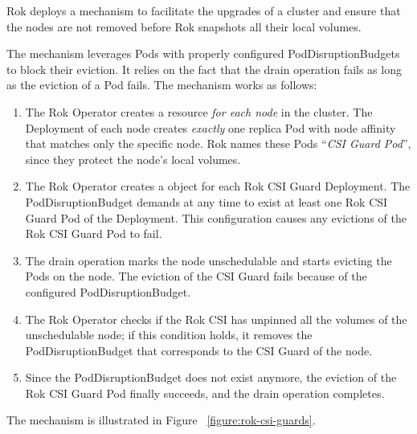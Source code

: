 Rok deploys a mechanism to facilitate the upgrades of a cluster and ensure that
the nodes are not removed before Rok snapshots all their local volumes.

The mechanism leverages Pods with properly configured PodDisruptionBudgets to
block their eviction. It relies on the fact that the drain operation fails as
long as the eviction of a Pod fails. The mechanism works as follows:

\begin{enumerate}
	\tightlist
	\item The Rok Operator creates a  resource \textit{for each
		      node} in the cluster. The Deployment of each node creates
	      \textit{exactly} one replica Pod with node affinity that matches
	      only the specific node. Rok names these Pods  ``\textit{CSI Guard
		      Pod}'', since they protect the node's local volumes.
	\item The Rok Operator creates a  object for each
	      Rok CSI Guard Deployment. The PodDisruptionBudget demands at any time
	      to exist at least one Rok CSI Guard Pod of the Deployment. This
	      configuration causes any evictions of the Rok CSI Guard Pod to fail.
	\item The drain operation marks the node unschedulable and starts evicting
	      the Pods on the node. The eviction of the CSI Guard fails because of
	      the configured PodDisruptionBudget.
	\item The Rok Operator checks if the Rok CSI has unpinned all the volumes of
	      the unschedulable node; if this condition holds, it removes the
	      PodDisruptionBudget that corresponds to the CSI Guard of the node.
	\item Since the PodDisruptionBudget does not exist anymore, the eviction of
	      the  Rok CSI Guard Pod finally succeeds, and the drain operation
	      completes.
\end{enumerate}

The mechanism is illustrated in Figure ~\ref{figure:rok-csi-guards}.

